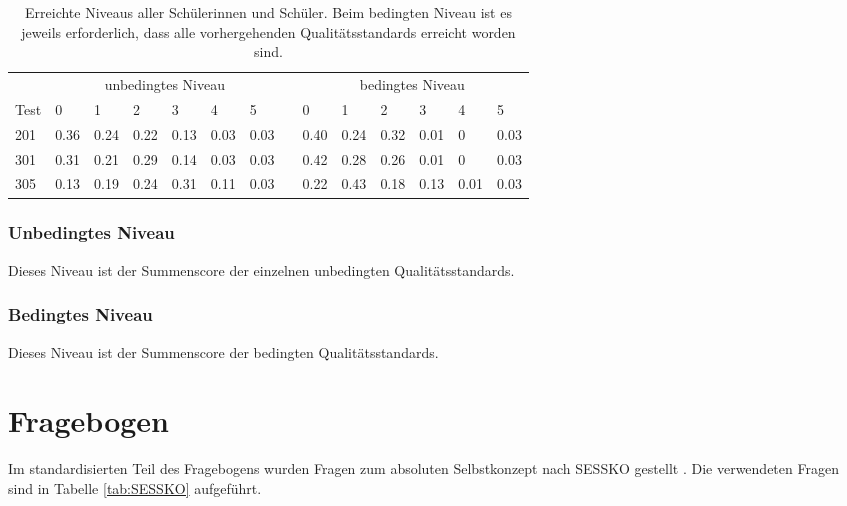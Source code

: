 \begin{table}[htbp]
  \centering
\begin{tabular}{@{}llllllllllllll@{}}
\toprule
 &  \multicolumn{6}{c}{unbedingtes Niveau} &&  \multicolumn{6}{c}{bedingtes Niveau}\\ 
 \cmidrule{2-7} \cmidrule{9-14}
 Test & 0 & 1 & 2 & 3 & 4 & 5 && 0 & 1 & 2 & 3 & 4 & 5\\ 
\midrule
 201 &   0.36 & 0.24 & 0.22 & 0.13 & 0.03 & 0.03 && 0.40 & 0.24 & 0.32  & 0.01 & 0 & 0.03   \\ 
 301 &   0.31 & 0.21 & 0.29 & 0.14 & 0.03 & 0.03  && 0.42 & 0.28 & 0.26 & 0.01 & 0 & 0.03  \\ 
 305 &   0.13 & 0.19 & 0.24 & 0.31 & 0.11 & 0.03  && 0.22 & 0.43 & 0.18 & 0.13 & 0.01 & 0.03 \\ 
\bottomrule
\end{tabular} 
  \caption{Erreichte Niveaus aller Schülerinnen und Schüler. Beim bedingten Niveau ist es jeweils erforderlich, dass alle vorhergehenden Qualitätsstandards erreicht worden sind.}
  \label{tab:Niveau}
\end{table}

\subsubsection{Unbedingtes Niveau}
Dieses Niveau ist der Summenscore der einzelnen unbedingten Qualitätsstandards.
\subsubsection{Bedingtes Niveau}

Dieses Niveau ist der Summenscore der bedingten Qualitätsstandards. 


\section{Fragebogen}

Im standardisierten Teil des Fragebogens wurden Fragen zum absoluten Selbstkonzept nach SESSKO gestellt \citep{Schone2002}. Die verwendeten Fragen sind in Tabelle \ref{tab:SESSKO} aufgeführt. 



